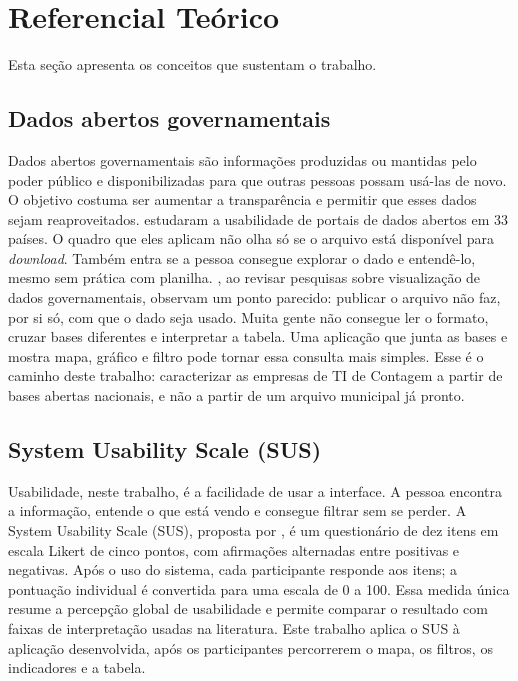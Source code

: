 \section{Referencial Teórico}

Esta seção apresenta os conceitos que sustentam o trabalho.

\subsection{Dados abertos governamentais}

Dados abertos governamentais são informações produzidas ou mantidas pelo poder público e disponibilizadas para que outras pessoas possam usá-las de novo.
O objetivo costuma ser aumentar a transparência e permitir que esses dados sejam reaproveitados.
 estudaram a usabilidade de portais de dados abertos em 33 países.
O quadro que eles aplicam não olha só se o arquivo está disponível para \textit{download}.
Também entra se a pessoa consegue explorar o dado e entendê-lo, mesmo sem prática com planilha.
, ao revisar pesquisas sobre visualização de dados governamentais, observam um ponto parecido: publicar o arquivo não faz, por si só, com que o dado seja usado.
Muita gente não consegue ler o formato, cruzar bases diferentes e interpretar a tabela.
Uma aplicação que junta as bases e mostra mapa, gráfico e filtro pode tornar essa consulta mais simples.
Esse é o caminho deste trabalho: caracterizar as empresas de TI de Contagem a partir de bases abertas nacionais, e não a partir de um arquivo municipal já pronto.

\subsection{System Usability Scale (SUS)}

Usabilidade, neste trabalho, é a facilidade de usar a interface.
A pessoa encontra a informação, entende o que está vendo e consegue filtrar sem se perder.
A System Usability Scale (SUS), proposta por , é um questionário de dez itens em escala Likert de cinco pontos, com afirmações alternadas entre positivas e negativas.
Após o uso do sistema, cada participante responde aos itens; a pontuação individual é convertida para uma escala de 0 a 100.
Essa medida única resume a percepção global de usabilidade e permite comparar o resultado com faixas de interpretação usadas na literatura.
Este trabalho aplica o SUS à aplicação desenvolvida, após os participantes percorrerem o mapa, os filtros, os indicadores e a tabela.


